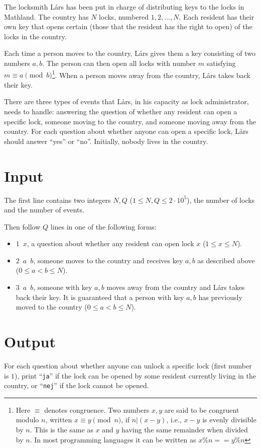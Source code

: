 The locksmith Lårs has been put in charge of distributing keys to the locks in Mathland. The country has $N$ locks, numbered $1,2,\ldots,N$. Each resident has their own key that opens certain (those that the resident has the right to open) of the locks in the country.

Each time a person moves to the country, Lårs gives them a key consisting of two numbers $a,b$. The person can then open all locks with number $m$ satisfying $m\equiv a \pmod{b}$\footnote{Here $\equiv$ denotes congruence. Two numbers $x,y$ are said to be congruent modulo $n$, written $x\equiv y \pmod{n}$, if $n|(x-y)$, i.e., $x-y$ is evenly divisible by $n$. This is the same as $x$ and $y$ having the same remainder when divided by $n$. In most programming languages it can be written as $x\%n==y\%n$}. When a person moves away from the country, Lårs takes back their key.

There are three types of events that Lårs, in his capacity as lock administrator, needs to handle: answering the question of whether any resident can open a specific lock, someone moving to the country, and someone moving away from the country. For each question about whether anyone can open a specific lock, Lårs should answer ``yes'' or ``no''. Initially, nobody lives in the country.

\section*{Input}
The first line contains two integers $N,Q$ ($1\leq N,Q \leq 2\cdot 10^5$), the number of locks and the number of events.

Then follow $Q$ lines in one of the following forms:
\begin{itemize}
  \item $1\enspace x$, a question about whether any resident can open lock $x$ ($1\leq x \leq N$).
  \item $2\enspace a\enspace b$, someone moves to the country and receives key $a,b$ as described above ($0\leq a < b \leq N$).
  \item $3\enspace a\enspace b$, someone with key $a,b$ moves away from the country and Lårs takes back their key. It is guaranteed that a person with key $a,b$ has previously moved to the country ($0\leq a < b \leq N$).
\end{itemize}

\section*{Output}
For each question about whether anyone can unlock a specific lock (first number is $1$), print ``\texttt{ja}'' if the lock can be opened by some resident currently living in the country, or ``\texttt{nej}'' if the lock cannot be opened.

